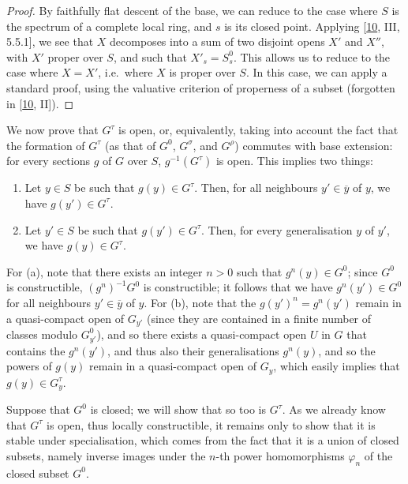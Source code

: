 \documentclass{article}
\providecommand{\tightlist}{%
  \setlength{\itemsep}{0pt}\setlength{\parskip}{0pt}}
\newcommand{\oldpage}[1]{\marginpar{\footnotesize$\Big\vert$ \textit{p.~#1}}}
\theoremstyle{definition}
\theoremstyle{definition}
\theoremstyle{definition}
\theoremstyle{definition}
\theoremstyle{remark}
\begin{document}
\begin{proof}
By faithfully flat descent of the base, we can reduce to the case where \(S\) is the spectrum of a complete local ring, and \(s\) is its closed point.
Applying {[}\protect\hyperlink{ref-GD1960}{10}, III, 5.5.1{]}, we see that \(X\) decomposes into a sum of two disjoint opens \(X'\) and \(X''\), with \(X'\) proper over \(S\), and such that \(X'_s=S_s^0\).
This allows us to reduce to the case where \(X=X'\), i.e.~where \(X\) is proper over \(S\).
In this case, we can apply a standard proof, using the valuative criterion of properness of a subset (forgotten in {[}\protect\hyperlink{ref-GD1960}{10}, II{]}).
\end{proof}

We now prove that \(G^\tau\) is open, or, equivalently, taking into account the fact that the formation of \(G^\tau\) (as that of \(G^0\), \(G^\sigma\), and \(G^\rho\)) commutes with base extension: for every sections \(g\) of \(G\) over \(S\), \(g^{-1}(G^\tau)\) is open.
This implies two things:

\begin{enumerate}
\def\labelenumi{\alph{enumi}.}
\tightlist
\item
  Let \(y\in S\) be such that \(g(y)\in G^\tau\).
  Then, for all neighbours \(y'\in\overline{y}\) of \(y\), we have \(g(y')\in G^\tau\).
\item
  Let \(y'\in S\) be such that \(g(y')\in G^\tau\).
  Then, for every generalisation \(y\) of \(y'\), we have \(g(y)\in G^\tau\).
\end{enumerate}

For (a), note that there exists an integer \(n>0\) such that \(g^n(y)\in G^0\); since \(G^0\) is constructible, \((g^n)^{-1}G^0\) is constructible;
it follows that we have \(g^n(y')\in G^0\) for all neighbours \(y'\in\overline{y}\) of \(y\).
For (b), note that the \(g(y')^n=g^n(y')\) remain in a quasi-compact open of \(G_{y'}\) (since they are contained in a finite number of classes modulo \(G_{y'}^0\)), and so there exists a quasi-compact open \(U\) in \(G\) that contains the \(g^n(y')\), and thus also their generalisations \(g^n(y)\), and so the powers of \(g(y)\) remain in a quasi-compact open of \(G_y\), which easily implies that \(g(y)\in G_y^\tau\).

\oldpage{236-06}Suppose that \(G^0\) is closed;
we will show that so too is \(G^\tau\).
As we already know that \(G^\tau\) is open, thus locally constructible, it remains only to show that it is stable under specialisation, which comes from the fact that it is a union of closed subsets, namely inverse images under the \(n\)-th power homomorphisms \(\varphi_n\) of the closed subset \(G^0\).
\end{document}
